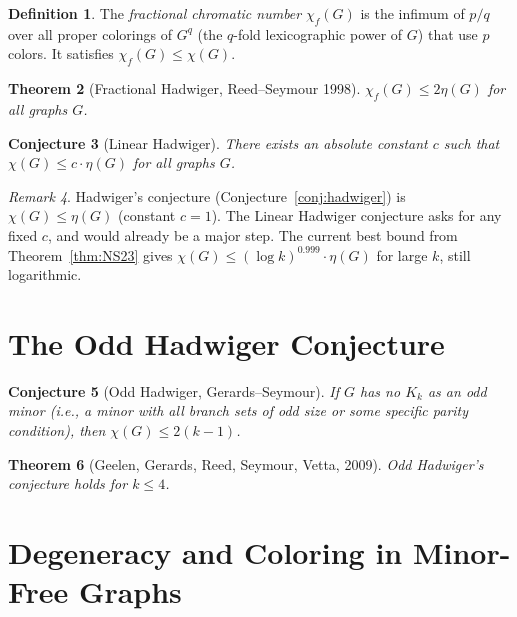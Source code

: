 \documentclass[12pt,a4paper]{amsart}
\newtheorem{theorem}{Theorem}[section]
\newtheorem{conjecture}[theorem]{Conjecture}
\theoremstyle{definition}
\newtheorem{definition}[theorem]{Definition}
\theoremstyle{remark}
\newtheorem{remark}[theorem]{Remark}
\begin{document}
\begin{definition}
The \emph{fractional chromatic number} $\chi_f(G)$ is the infimum of $p/q$
over all proper colorings of $G^q$ (the $q$-fold lexicographic power of $G$)
that use $p$ colors. It satisfies $\chi_f(G) \leq \chi(G)$.
\end{definition}

\begin{theorem}[Fractional Hadwiger, Reed--Seymour 1998]\label{thm:fracHad}
$\chi_f(G) \leq 2\eta(G)$ for all graphs $G$.
\end{theorem}

\begin{conjecture}[Linear Hadwiger]\label{conj:linHad}
There exists an absolute constant $c$ such that $\chi(G) \leq c \cdot \eta(G)$
for all graphs $G$.
\end{conjecture}

\begin{remark}
Hadwiger's conjecture (Conjecture~\ref{conj:hadwiger}) is $\chi(G) \leq \eta(G)$
(constant $c = 1$). The Linear Hadwiger conjecture asks for any fixed $c$,
and would already be a major step. The current best bound from Theorem~\ref{thm:NS23}
gives $\chi(G) \leq (\log k)^{0.999} \cdot \eta(G)$ for large $k$, still logarithmic.
\end{remark}

\section{The Odd Hadwiger Conjecture}

\begin{conjecture}[Odd Hadwiger, Gerards--Seymour]\label{conj:odd}
If $G$ has no $K_k$ as an \emph{odd minor} (i.e., a minor with all branch sets
of odd size or some specific parity condition), then $\chi(G) \leq 2(k-1)$.
\end{conjecture}

\begin{theorem}[Geelen, Gerards, Reed, Seymour, Vetta, 2009]\label{thm:oddHad}
Odd Hadwiger's conjecture holds for $k \leq 4$.
\end{theorem}

\section{Degeneracy and Coloring in Minor-Free Graphs}
\end{document}
